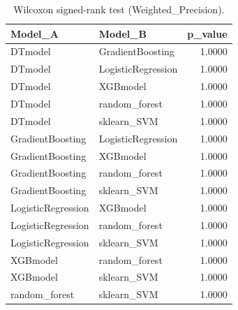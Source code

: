 \begin{table}[t]
\centering
\begin{tabular}{llr}
\toprule
Model_A & Model_B & p_value \\
\midrule
DTmodel & GradientBoosting & 1.0000 \\
DTmodel & LogisticRegression & 1.0000 \\
DTmodel & XGBmodel & 1.0000 \\
DTmodel & random_forest & 1.0000 \\
DTmodel & sklearn_SVM & 1.0000 \\
GradientBoosting & LogisticRegression & 1.0000 \\
GradientBoosting & XGBmodel & 1.0000 \\
GradientBoosting & random_forest & 1.0000 \\
GradientBoosting & sklearn_SVM & 1.0000 \\
LogisticRegression & XGBmodel & 1.0000 \\
LogisticRegression & random_forest & 1.0000 \\
LogisticRegression & sklearn_SVM & 1.0000 \\
XGBmodel & random_forest & 1.0000 \\
XGBmodel & sklearn_SVM & 1.0000 \\
random_forest & sklearn_SVM & 1.0000 \\
\bottomrule
\end{tabular}
\caption{Wilcoxon signed-rank test (Weighted_Precision).}
\label{tab:wilcoxon_Weighted_Precision}
\end{table}